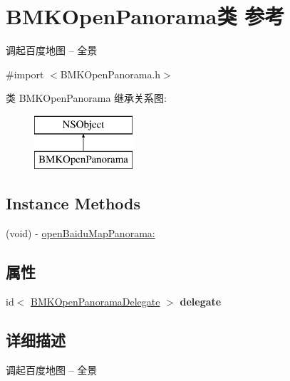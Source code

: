 \hypertarget{interface_b_m_k_open_panorama}{}\section{B\+M\+K\+Open\+Panorama类 参考}
\label{interface_b_m_k_open_panorama}


调起百度地图 -- 全景  




{\ttfamily \#import $<$B\+M\+K\+Open\+Panorama.\+h$>$}

类 B\+M\+K\+Open\+Panorama 继承关系图\+:\begin{figure}[H]
\begin{center}
\leavevmode
\includegraphics[height=2.000000cm]{interface_b_m_k_open_panorama}
\end{center}
\end{figure}
\subsection*{Instance Methods}
\begin{DoxyCompactItemize}
\item 
(void) -\/ \hyperlink{interface_b_m_k_open_panorama_a2b1dc63667eac58644dd0aa7aa1f7f40}{open\+Baidu\+Map\+Panorama\+:}
\end{DoxyCompactItemize}
\subsection*{属性}
\begin{DoxyCompactItemize}
\item 
\hypertarget{interface_b_m_k_open_panorama_afc598ee9f4b412e9311dd1d5155722b3}{}id$<$ \hyperlink{protocol_b_m_k_open_panorama_delegate-p}{B\+M\+K\+Open\+Panorama\+Delegate} $>$ {\bfseries delegate}\label{interface_b_m_k_open_panorama_afc598ee9f4b412e9311dd1d5155722b3}

\end{DoxyCompactItemize}


\subsection{详细描述}
调起百度地图 -- 全景 

